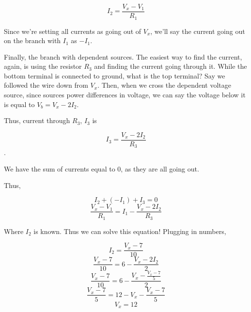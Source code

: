 \begin{enumerate}
{$$
I_2 = \frac{V_x - V_1}{R_1}
$$

Since we're setting all currents as going out of $V_x$, we'll say the current going out on the branch with $I_1$ as $-I_1$. 

Finally, the branch with dependent sources. The easiest way to find the current, again, is using the resistor $R_3$ and finding the current going through it. While the bottom terminal is connected to ground, what is the top terminal? 
Say we followed the wire down from $V_x$. Then, when we cross the dependent voltage source, since sources power differences in voltage, we can say the voltage below it is equal to $V_b = V_x - 2I_2$.

Thus, current through $R_3$, $I_3$ is 

$$I_3 = \frac{V_x - 2I_2}{R_3}$$.

We have the sum of currents equal to 0, as they are all going out.

Thus,

$$I_2 + (-I_1) + I_3 = 0$$
$$\frac{V_x - V_1}{R_1} = I_1 - \frac{V_x - 2I_2}{R_3}$$

Where $I_2$ is known. Thus we can solve this equation! Plugging in numbers,

$$I_2 = \frac{V_x - 7}{10}$$
$$\frac{V_x - 7}{10} = 6 - \frac{V_x - 2I_2}{2}$$
$$\frac{V_x - 7}{10} = 6 - \frac{V_x - \frac{V_x - 7}{5}}{2}$$
$$\frac{V_x - 7}{5} = 12 - V_x - \frac{V_x - 7}{5}$$
$$V_x = 12$$

}


\end{enumerate}
